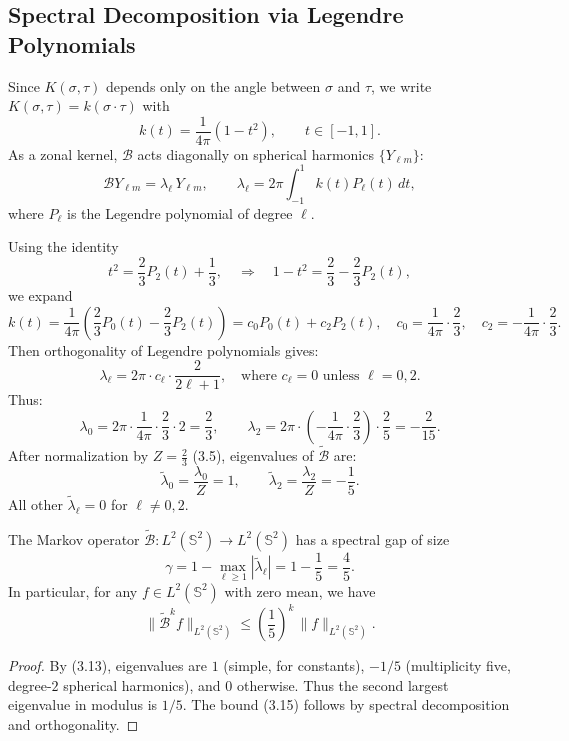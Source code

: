 \documentclass[11pt]{article}
\begin{document}
\subsection{Spectral Decomposition via Legendre Polynomials}

Since $K(\sigma, \tau)$ depends only on the angle between $\sigma$ and $\tau$, we write $K(\sigma, \tau) = k(\sigma \cdot \tau)$ with
\[
k(t) = \frac{1}{4\pi} (1 - t^2), \qquad t \in [-1,1]. \tag{3.7}
\]
As a zonal kernel, $\mathcal{B}$ acts diagonally on spherical harmonics $\{Y_{\ell m}\}$:
\begin{equation}
\mathcal{B} Y_{\ell m} = \lambda_\ell \, Y_{\ell m}, \qquad \lambda_\ell = 2\pi \int_{-1}^1 k(t) P_\ell(t) \, dt, \tag{3.8}
\end{equation}
where $P_\ell$ is the Legendre polynomial of degree $\ell$.

Using the identity 
\[
t^2 = \frac{2}{3}P_2(t) + \frac{1}{3}, \quad \Rightarrow \quad 1 - t^2 = \frac{2}{3} - \frac{2}{3} P_2(t), \tag{3.9}
\]
we expand 
\[
k(t) = \frac{1}{4\pi} \left( \frac{2}{3}P_0(t) - \frac{2}{3} P_2(t) \right) = c_0 P_0(t) + c_2 P_2(t), \quad c_0 = \frac{1}{4\pi} \cdot \frac{2}{3}, \quad c_2 = -\frac{1}{4\pi} \cdot \frac{2}{3}. \tag{3.10}
\]
Then orthogonality of Legendre polynomials gives:
\[
\lambda_\ell = 2\pi \cdot c_\ell \cdot \frac{2}{2\ell + 1}, \quad \text{where } c_\ell = 0 \text{ unless } \ell = 0, 2. \tag{3.11}
\]
Thus:
\[
\lambda_0 = 2\pi \cdot \frac{1}{4\pi} \cdot \frac{2}{3} \cdot 2 = \frac{2}{3}, 
\qquad \lambda_2 = 2\pi \cdot \left(-\frac{1}{4\pi} \cdot \frac{2}{3} \right) \cdot \frac{2}{5} = -\frac{2}{15}. \tag{3.12}
\]
After normalization by $Z = \frac{2}{3}$ (3.5), eigenvalues of $\tilde{\mathcal{B}}$ are:
\[
\tilde{\lambda}_0 = \frac{\lambda_0}{Z} = 1, \qquad \tilde{\lambda}_2 = \frac{\lambda_2}{Z} = -\frac{1}{5}. \tag{3.13}
\]
All other $\tilde{\lambda}_\ell = 0$ for $\ell \neq 0,2$.

\begin{lemma} \label{lem:spectral-gap}
The Markov operator $\tilde{\mathcal{B}} : L^2(\mathbb{S}^2) \to L^2(\mathbb{S}^2)$ has a spectral gap of size
\[
\gamma = 1 - \max_{\ell \geq 1} |\tilde{\lambda}_\ell| = 1 - \frac{1}{5} = \frac{4}{5}. \tag{3.14}
\]
In particular, for any $f \in L^2(\mathbb{S}^2)$ with zero mean, we have
\[
\|\tilde{\mathcal{B}}^k f\|_{L^2(\mathbb{S}^2)} \leq \left(\frac{1}{5}\right)^k \, \|f\|_{L^2(\mathbb{S}^2)}. \tag{3.15}
\]
\end{lemma}
\begin{proof}
By (3.13), eigenvalues are $1$ (simple, for constants), $-1/5$ (multiplicity five, degree-$2$ spherical harmonics), and $0$ otherwise. Thus the second largest eigenvalue in modulus is $1/5$. The bound (3.15) follows by spectral decomposition and orthogonality.
\end{proof}
\end{document}
